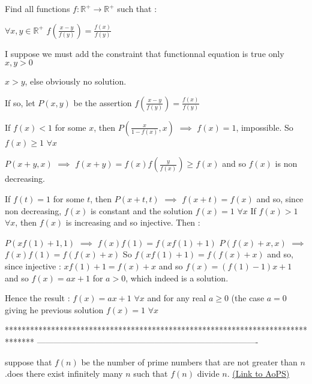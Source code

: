 \begin{solution}
	\begin{tcolorbox}Find all functions $f:\mathbb{R^+} \to \mathbb{R^+}$ such that :

$\forall x,y\in \mathbb{R^+}$ $f(\frac{x-y}{f(y)})=\frac{f(x)}{f(y)}$\end{tcolorbox}
I suppose we must add the constraint that functionnal equation is true only $x,y>0$ $x>y$, else obviously no solution.

If so, let $P(x,y)$ be the assertion $f(\frac{x-y}{f(y)})=\frac{f(x)}{f(y)}$

If $f(x)<1$ for some $x$, then $P(\frac x{1-f(x)},x)$ $\implies$ $f(x)=1$, impossible. So $f(x)\ge 1$ $\forall x$

$P(x+y,x)$ $\implies$ $f(x+y)=f(x)f(\frac y{f(x)})\ge f(x)$ and so $f(x)$ is non decreasing.

If $f(t)=1$ for some $t$, then $P(x+t,t)$ $\implies$ $f(x+t)=f(x)$ and so, since non decreasing, $f(x)$ is constant and the solution $f(x)=1$ $\forall x$
If $f(x)>1$ $\forall x$, then $f(x)$ is increasing and so injective. Then :

$P(xf(1)+1,1)$ $\implies$ $f(x)f(1)=f(xf(1)+1)$
$P(f(x)+x,x)$ $\implies$ $f(x)f(1)=f(f(x)+x)$
So $f(xf(1)+1)=f(f(x)+x)$ and so, since injective : $xf(1)+1=f(x)+x$ and so $f(x)=(f(1)-1)x+1$ and so $f(x)=ax+1$ for $a>0$, which indeed is a solution.

Hence the result : $\boxed{f(x)=ax+1}$ $\forall x$ and for any real $a\ge 0$ (the case $a=0$ giving he previous solution $f(x)=1$ $\forall x$
\end{solution}
*******************************************************************************
-------------------------------------------------------------------------------

\begin{problem}
	suppose that $f(n)$ be the number of prime numbers that are not greater than $n$.does there exist infinitely many $n$ such that $f(n)$ divide $n$.
	\flushright \href{https://artofproblemsolving.com/community/c6h475159}{(Link to AoPS)}
\end{problem}



